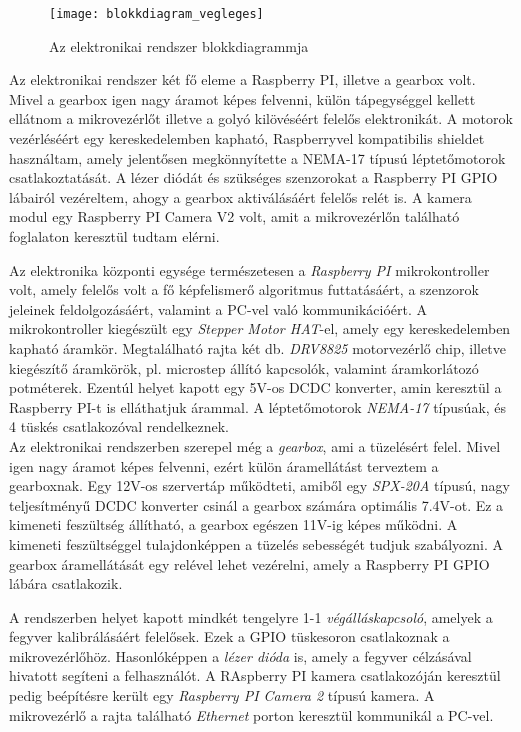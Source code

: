\begin{figure}[h!]
	\centering
	\texttt{[image: blokkdiagram\_vegleges]}
	\caption{Az elektronikai rendszer blokkdiagrammja}
	\label{fig:system_blokkdiagram}
\end{figure}

Az elektronikai rendszer két fő eleme a Raspberry PI, illetve a gearbox volt. Mivel a gearbox igen nagy áramot képes felvenni, külön tápegységgel kellett ellátnom a mikrovezérlőt illetve a golyó kilövéséért felelős elektronikát. A motorok vezérléséért egy kereskedelemben kapható, Raspberryvel kompatibilis shieldet használtam, amely jelentősen megkönnyítette a NEMA-17 típusú léptetőmotorok csatlakoztatását. A lézer diódát és szükséges szenzorokat a Raspberry PI GPIO lábairól vezéreltem, ahogy a gearbox aktiválásáért felelős relét is. A kamera modul egy Raspberry PI Camera V2 volt, amit a mikrovezérlőn található foglalaton keresztül tudtam elérni. 

Az elektronika központi egysége természetesen a \textsl{Raspberry PI} mikrokontroller volt, amely felelős volt a fő képfelismerő algoritmus futtatásáért, a szenzorok jeleinek feldolgozásáért, valamint a PC-vel való kommunikációért. A mikrokontroller kiegészült egy \textsl{Stepper Motor HAT}-el, amely egy kereskedelemben kapható áramkör. Megtalálható rajta két db. \textsl{DRV8825} motorvezérlő chip, illetve kiegészítő áramkörök, pl. microstep állító kapcsolók, valamint áramkorlátozó potméterek. Ezentúl helyet kapott egy 5V-os DCDC konverter, amin keresztül a Raspberry PI-t is elláthatjuk árammal. A léptetőmotorok \textsl{NEMA-17} típusúak, és 4 tüskés csatlakozóval rendelkeznek.\\

Az elektronikai rendszerben szerepel még a \textsl{gearbox}, ami a tüzelésért felel. Mivel igen nagy áramot képes felvenni, ezért külön áramellátást terveztem a gearboxnak. Egy 12V-os szervertáp működteti, amiből egy \textsl{SPX-20A} típusú, nagy teljesítményű DCDC konverter csinál a gearbox számára optimális 7.4V-ot. Ez a kimeneti feszültség állítható, a gearbox egészen 11V-ig képes működni. A kimeneti feszültséggel tulajdonképpen a tüzelés sebességét tudjuk szabályozni. A gearbox áramellátását egy relével lehet vezérelni, amely a Raspberry PI GPIO lábára csatlakozik.

\pagebreak

A rendszerben helyet kapott mindkét tengelyre 1-1 \textsl{végálláskapcsoló}, amelyek a fegyver kalibrálásáért felelősek. Ezek a GPIO tüskesoron csatlakoznak a mikrovezérlőhöz. Hasonlóképpen a \textsl{lézer dióda} is, amely a fegyver célzásával hivatott segíteni a felhasználót. A RAspberry PI kamera csatlakozóján keresztül pedig beépítésre került egy \textsl{Raspberry PI Camera 2} típusú kamera. A mikrovezérlő a rajta található \textsl{Ethernet} porton keresztül kommunikál a PC-vel.

